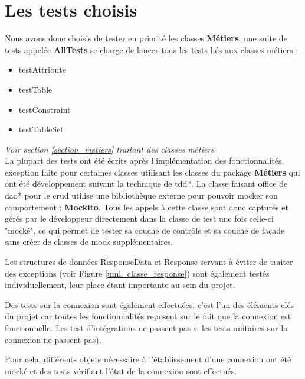 \section{Les tests choisis}

Nous avons donc choisis de tester en priorité les classes \textbf{Métiers}, une suite de tests appelée \textbf{AllTests} se charge  de lancer tous les tests liés aux classes métiers : 
\\

\begin{itemize}
	\item testAttribute
	\item testTable
	\item testConstraint
	\item testTableSet
\end{itemize}

\textit{Voir section \ref{section_metiers} traitant des classes métiers}
\\


La plupart des tests ont été écrits après l'implémentation des fonctionnalités, exception faite pour certaines classes utilisant les classes du package \textbf{Métiers} qui ont été développement suivant la technique de \gls{tdd}*.
\medbreak
La classe faisant office de \gls{dao}* pour le \gls{crud} utilise une bibliothèque externe pour pouvoir mocker son comportement : \textbf{Mockito}. Tous les appels à cette classe sont donc capturés et gérés par le développeur directement dans la classe de test une fois celle-ci "mocké", ce qui permet de tester sa couche de contrôle et sa couche de façade sans créer de classes de \gls{mock} supplémentaires.

\medbreak

Les structures de données ResponseData et Response servant à éviter de traiter des exceptions (voir Figure  \ref{uml_classe_response}) sont également testés individuellement, leur place étant importante au sein du projet.

\bigbreak
Des tests sur la connexion sont également effectuées, c'est l'un des éléments clés du projet car toutes les fonctionnalités reposent sur le fait que la connexion est fonctionnelle. Les test d'intégrations ne passent pas si les tests unitaires sur la connexion ne passent pas).

Pour cela, différents objets nécessaire à l'établissement d'une connexion ont été mocké et des tests vérifiant l'état de la connexion sont effectués.


